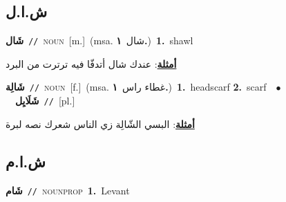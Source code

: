 \documentclass[10pt,a4paper,twoside]{article} %
\begin{document}
\begin{multicols}{2}
{{{\vspace{-3mm}
\subsection*{\color{blue}\foreignlanguage{arabic}{ش.ا.ل}\color{blue}{ (ntws)}} 

{\setlength\topsep{0pt}\textbf{\foreignlanguage{arabic}{شَال}}\ {\color{gray}\texttt{//}\color{black}}\ \textsc{noun}\ [m.]\ \color{gray}(msa. \foreignlanguage{arabic}{شال}~\foreignlanguage{arabic}{\textbf{١.}})\color{black}\ \textbf{1.}~shawl\  \begin{flushright}\color{gray}\foreignlanguage{arabic}{\textbf{\underline{\foreignlanguage{arabic}{أمثلة}}}: عندك شال أتدفّا فيه ترترت من البرد}\end{flushright}\color{black}} \vspace{2mm}

{\setlength\topsep{0pt}\textbf{\foreignlanguage{arabic}{شَالِة}}\ {\color{gray}\texttt{//}\color{black}}\ \textsc{noun}\ [f.]\ \color{gray}(msa. \foreignlanguage{arabic}{غطاء راس}~\foreignlanguage{arabic}{\textbf{١.}})\color{black}\ \textbf{1.}~headscarf  \textbf{2.}~scarf\ \ $\bullet$\ \ \setlength\topsep{0pt}\textbf{\foreignlanguage{arabic}{شَلَايِل}}\ {\color{gray}\texttt{//}\color{black}}\ [pl.]\  \begin{flushright}\color{gray}\foreignlanguage{arabic}{\textbf{\underline{\foreignlanguage{arabic}{أمثلة}}}: البسي الشّالِة زي الناس شعرك نصه لبرة}\end{flushright}\color{black}} \vspace{2mm}

\vspace{-3mm}
\subsection*{\color{blue}\foreignlanguage{arabic}{ش.ا.م}\color{blue}{ (ntws)}} 

{\setlength\topsep{0pt}\textbf{\foreignlanguage{arabic}{شَام}}\ {\color{gray}\texttt{//}\color{black}}\ \textsc{noun\textunderscore prop}\ \textbf{1.}~Levant\ 

}}}}
\end{multicols}
\end{document}
